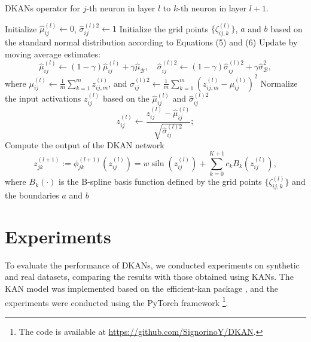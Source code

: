 \documentclass[11pt]{scrartcl}
\begin{document}
\begin{algorithm}[htbp]
	\caption{DKANs operator for $j$-th neuron in layer $l$ to $k$-th neuron in layer $l+1$.}
	\label{alg:dkan-operator}
	Initialize $\widehat{\mu}_{ij}^{(l)} \leftarrow 0$, $\widehat{\sigma}_{ij}^{(l)2} \leftarrow 1$\;
	Initialize the grid points $\{\zeta_{ij,k}^{(l)}\}$, $a$ and $b$ based on the standard normal distribution according to Equations (5) and (6)\;
	 {
	Update by moving average estimates:
	\begin{equation*}
		\widehat{\mu}_{ij}^{(l)} \leftarrow (1 - \gamma)\widehat{\mu}_{ij}^{(l)} + \gamma\widehat{\mu}_{\mathcal{B}}, \quad \widehat{\sigma}_{ij}^{(l)2} \leftarrow (1 - \gamma)\widehat{\sigma}_{ij}^{(l)2} + \gamma\widehat{\sigma}_{\mathcal{B}}^{2},
	\end{equation*}
	where $\mu_{ij}^{(l)} \leftarrow \frac{1}{m}\sum_{k=1}^{m}z_{ij,m}^{(l)}$, and $\sigma_{ij}^{(l)2} \leftarrow \frac{1}{m}\sum_{k=1}^{m}\left(z_{ij,m}^{(l)} - \mu_{ij}^{(l)}\right)^{2}$\;
	Normalize the input activations $z_{ij}^{(l)}$ based on the $\widehat{\mu}_{ij}^{(l)}$ and $\widehat{\sigma}_{ij}^{(l)2}$
	\begin{equation*}
		z_{ij}^{(l)} \leftarrow \frac{z_{ij}^{(l)} - \widehat{\mu}_{ij}^{(l)}}{\sqrt{\widehat{\sigma}_{ij}^{(l)2}}};
	\end{equation*}
	Compute the output of the DKAN network
	\begin{equation*}
		z_{jk}^{(l+1)}:=\phi_{jk}^{(l+1)}(z_{ij}^{(l)})=w\operatorname{silu}(z_{ij}^{(l)})+\sum_{k=0}^{K+1}c_{k}B_{k}(z_{ij}^{(l)}),
	\end{equation*}
	where $B_{k}(\cdot)$ is the B-spline basis function defined by the grid points $\{\zeta_{ij,k}^{(l)}\}$ and the boundaries $a$ and $b$\;
	}
\end{algorithm}

\section{Experiments}

To evaluate the performance of DKANs, we conducted experiments on synthetic and real datasets, comparing the results with those obtained using KANs.
The KAN model was implemented based on the efficient-kan package \cite{blealtan2024blealtan}, and the experiments were conducted using the PyTorch framework \footnote{The code is available at \href{https://github.com/SignorinoY/DKAN}{https://github.com/SignorinoY/DKAN}.}.
\end{document}

